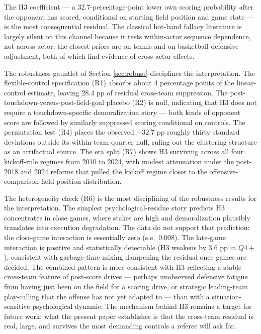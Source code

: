 \documentclass[11pt]{article}
\begin{document}
The H3 coefficient --- a 32.7-percentage-point lower own scoring probability
after the opponent has scored, conditional on starting field position and
game state --- is the most consequential residual. The classical hot-hand
fallacy literature is largely silent on this channel because it tests
within-actor sequence dependence, not across-actor; the closest priors are
\citet{gauriot2019does} on tennis and \citet{csapo2014hand} on basketball
defensive adjustment, both of which find evidence of cross-actor effects.

The robustness gauntlet of Section \ref{sec:robust} disciplines the
interpretation. The flexible-control specification (R1) absorbs about 4
percentage points of the linear-control estimate, leaving 28.4 pp of
residual cross-team suppression. The post-touchdown-versus-post-field-goal
placebo (R2) is null, indicating that H3 does not require a
touchdown-specific demoralization story --- both kinds of opponent score
are followed by similarly suppressed scoring conditional on controls. The
permutation test (R4) places the observed $-32.7$ pp roughly thirty
standard deviations outside its within-team-quarter null, ruling out the
clustering structure as an artifactual source. The era split (R7) shows
H3 surviving across all four kickoff-rule regimes from 2010 to 2024, with
modest attenuation under the post-2018 and 2024 reforms that pulled the
kickoff regime closer to the offensive-comparison field-position
distribution.

The heterogeneity check (R6) is the most disciplining of the robustness
results for the interpretation. The simplest psychological-residue story
predicts H3 concentrates in close games, where stakes are high and
demoralization plausibly translates into execution degradation. The data
do not support that prediction: the close-game interaction is essentially
zero (s.e.\ 0.008). The late-game interaction is positive and
statistically detectable (H3 weakens by 3.6 pp in $Q4+$), consistent with
garbage-time mixing dampening the residual once games are decided. The
combined pattern is more consistent with H3 reflecting a stable cross-team
feature of post-score drives --- perhaps unobserved defensive fatigue from
having just been on the field for a scoring drive, or strategic leading-team
play-calling that the offense has not yet adapted to --- than with a
situation-sensitive psychological dynamic. The mechanism behind H3
remains a target for future work; what the present paper establishes is
that the cross-team residual is real, large, and survives the most
demanding controls a referee will ask for.
\end{document}
